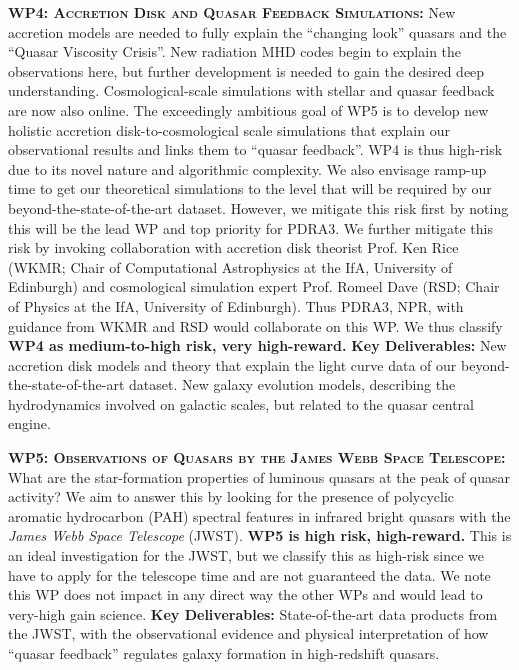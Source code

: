 \documentclass[oneside, a4paper, onecolumn, 11pt]{article}
\begin{document}
\smallskip
\smallskip
\noindent
\textbf{\textsc{WP4: Accretion Disk and Quasar Feedback Simulations:}} 
New accretion models are needed to fully explain the ``changing look'' quasars 
and the ``Quasar Viscosity Crisis''. New radiation MHD codes begin to
explain the observations here, but further development is needed to
gain the desired deep understanding. Cosmological-scale 
simulations with stellar and quasar feedback are now also online. The
exceedingly ambitious goal of WP5 is to develop new holistic accretion
disk-to-cosmological scale simulations that explain our observational
results and links them to ``quasar feedback''.  WP4 is thus high-risk
due to its novel nature and algorithmic complexity.  We also envisage
ramp-up time to get our theoretical simulations to the level that will
be required by our beyond-the-state-of-the-art dataset.  However, we
mitigate this risk first by noting this will be the lead WP and top
priority for PDRA3.  We further mitigate this risk by invoking
collaboration with accretion disk theorist Prof. Ken Rice (WKMR; Chair
of Computational Astrophysics at the IfA, University of Edinburgh) and 
cosmological simulation expert 
Prof. Romeel Dave (RSD; Chair of Physics at the IfA, University of
Edinburgh).
Thus PDRA3, NPR, with guidance from
WKMR and RSD would collaborate on this WP.  We thus classify {\bf WP4
as medium-to-high risk, very high-reward.}  {\bf Key Deliverables:}
New accretion disk models and theory that explain the light curve data
of our beyond-the-state-of-the-art dataset.  New galaxy evolution
models, describing the hydrodynamics involved on galactic scales, but
related to the quasar central engine.


\smallskip
\smallskip
\noindent
\textbf{\textsc{WP5: Observations of Quasars by the James Webb Space Telescope:}} 
What are the star-formation properties of luminous quasars at the peak
of quasar activity?  We aim to answer this by looking for the presence
of polycyclic aromatic hydrocarbon (PAH) spectral features in infrared
bright quasars with the {\it James Webb Space Telescope} (JWST).  {\bf
WP5 is high risk, high-reward.}  This is an ideal investigation for
the JWST, but we classify this as high-risk since we have to apply for
the telescope time and are not guaranteed the data.  We note this WP
does not impact in any direct way the other WPs and would lead to
very-high gain science.  {\bf Key Deliverables:} State-of-the-art data
products from the JWST, with the observational evidence and physical
interpretation of how ``quasar feedback'' regulates galaxy formation
in high-redshift quasars.
\end{document}
